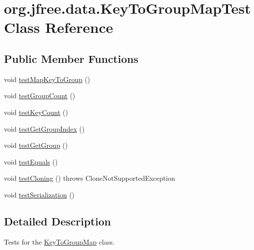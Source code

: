 \hypertarget{classorg_1_1jfree_1_1data_1_1_key_to_group_map_test}{}\section{org.\+jfree.\+data.\+Key\+To\+Group\+Map\+Test Class Reference}
\label{classorg_1_1jfree_1_1data_1_1_key_to_group_map_test}
\subsection*{Public Member Functions}
\begin{DoxyCompactItemize}
\item 
void \mbox{\hyperlink{classorg_1_1jfree_1_1data_1_1_key_to_group_map_test_a9e68b860a8674f45968981cf69020c70}{test\+Map\+Key\+To\+Group}} ()
\item 
void \mbox{\hyperlink{classorg_1_1jfree_1_1data_1_1_key_to_group_map_test_a871c46b7cda316d5bd30918c2a9f41aa}{test\+Group\+Count}} ()
\item 
void \mbox{\hyperlink{classorg_1_1jfree_1_1data_1_1_key_to_group_map_test_ac58649fc9e7d5d2e20351dd9de635aeb}{test\+Key\+Count}} ()
\item 
void \mbox{\hyperlink{classorg_1_1jfree_1_1data_1_1_key_to_group_map_test_aac3398fcd2087721c41d69dd75241162}{test\+Get\+Group\+Index}} ()
\item 
void \mbox{\hyperlink{classorg_1_1jfree_1_1data_1_1_key_to_group_map_test_a57772447a68bfadcf855d12bca8559b5}{test\+Get\+Group}} ()
\item 
void \mbox{\hyperlink{classorg_1_1jfree_1_1data_1_1_key_to_group_map_test_af7cc4ce0ab2deb83108ec0829ed0dc16}{test\+Equals}} ()
\item 
void \mbox{\hyperlink{classorg_1_1jfree_1_1data_1_1_key_to_group_map_test_abeb13cb433a3dff31bc015755736634f}{test\+Cloning}} ()  throws Clone\+Not\+Supported\+Exception 
\item 
void \mbox{\hyperlink{classorg_1_1jfree_1_1data_1_1_key_to_group_map_test_a013736b30322026945f13cbff3612fef}{test\+Serialization}} ()
\end{DoxyCompactItemize}


\subsection{Detailed Description}
Tests for the \mbox{\hyperlink{classorg_1_1jfree_1_1data_1_1_key_to_group_map}{Key\+To\+Group\+Map}} class. 

